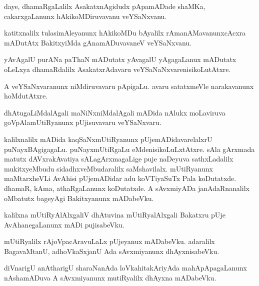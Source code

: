 \documentclass{article}
\begin{document}
\begin{mn}%
daye, dhamaRgaLalilx AsakatxnAgidudx pApamADade shaMKa, cakarxgaLanunx hAkikoMDiruvavanu veYSaNxvanu.
\end{mn}

\begin{mn}%
katitxnalilx tulasimAleyanunx hAkikoMDu bAyalilx rAmanAMavanunxcAcxra mADutAtx BakitxyiMda 
gAnamADuvavaneV veYSaNxvanu.
\end{mn}

\begin{mn}%
yAvAgalU purANa paThaN mADutatx yAvagalU yAgagaLanux mADutatx oLeLxya dhamaRdalilx AsakatxrAdavaru 
veYSaNaNxvarenisikoLutAtxre.
\end{mn}

\begin{mn}%
A veYSaNxvaranunx niMdiruvavaru pApigaLu. avaru satatxmeVle narakavanunx hoMdutAtxre.
\end{mn}

\begin{mn}%
dhAtugaLiMdalAgali maNiNxniMdalAgali mADida nAlukx moLaviruva goVpAlamUtiRyanunx pUjisuvavaru 
veYSaNxvaru.
\end{mn}

\begin{mn}%
kalilxnalilx mADida kaqSaNxmUtiRyanunx pUjemADidavarelalxrU puNayxBAgigagaLu. puNayxmUtiRgaLu 
eMdenisikoLuLxtAtxre. sAla gArxmada matutx dAVxrakAvatiya sALagArxmagaLige puje naDeyuva 
sathxLadalilx mukitxyeMbudu sidadhxveMbudaralilx saMshavilalx. mUtiRyanunx maMtarxheVLi AvAhisi 
pUjemADidar adu koVTiyaSuTx Pala koDutatxde. dhamaR, kAma, athaRgaLanunx koDutatxde. A sAvxmiyADa 
janAdaRnanalilx oMbatutx bageyAgi Bakitxyanunx mADabeVku.
\end{mn}

\begin{mn}%
kalilxna mUtiRyAlAlxgaliV dhAtuvina mUtiRyalAlxgali Bakatxru pUje AvAhanegaLanunx mADi pujisabeVku.
\end{mn}

\begin{mn}%
mUtiRyalilx rAjoVpacAravuLaLx pUjeyanux mADabeVku. adaralilx BagavaMtanU, adhoVkaSxjanU Ada 
sAvxmiyanunx dhAyxnisabeVku.
\end{mn}

\begin{mn}%
diVnarigU anAtharigU sharaNanAda loVkahitakAriyAda mahApApagaLanunx nAshamADuva A sAvxmiyanunx 
mutiRyalilx dhAyxna mADabeVku.
\end{mn}
\end{document}
